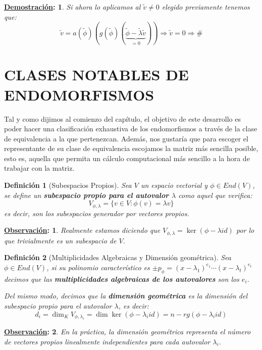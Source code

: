 \documentclass[10pt,a4paper,openright]{book}
\theoremstyle{break}
\newtheorem*{defi}{Definición}
\newtheorem*{demo}{\underline{Demostración}:}
\newtheorem*{obs}{\underline{Observación}:}
\begin{document}
\begin{demo}
Si ahora lo aplicamos al $\tilde{v}\neq 0$ elegido previamente tenemos que:
$$\tilde{v}=a(\tilde{\phi})\left(g(\tilde{\phi})\left(\underbrace{\tilde{\phi}-\tilde{\lambda}\tilde{v}}_{=0}\right)\right)\Rightarrow \tilde{v}=0\Rightarrow\#$$
\end{demo}


\section{CLASES NOTABLES DE ENDOMORFISMOS}
Tal y como dijimos al comienzo del capítulo, el objetivo de este desarrollo es poder hacer una clasificación exhaustiva de los endomorfismos a través de la clase de equivalencia a la que pertenezcan. Además, nos gustaría que para escoger el representante de su clase de equivalencia escojamos la matriz más sencilla posible, esto es, aquella que permita un cálculo computacional más sencillo a la hora de trabajar con la matriz.


\begin{defi}[Subespacios Propios]
Sea $V$ un espacio vectorial y $\phi  \in End(V)$, se define un \textbf{subespacio propio para el autovalor $\lambda$} como aquel que verifica:
$$V_{\phi, \lambda}=\{v\in V : \phi(v) = \lambda v\}$$
es decir, son los subespacios generador por vectores propios.
\end{defi}

\begin{obs}
Realmente estamos diciendo que $V_{\phi,\lambda} = \ker(\phi-\lambda id)$ por lo que trivialmente es un subespacio de $V$.
\end{obs}

\begin{defi}[Multiplicidades Algebraicas y Dimensión geométrica]
Sea $\phi \in End(V)$, si su polinomio característico es $\pm p_\phi=(x-\lambda_1)^{e_1}\cdots (x-\lambda_t)^{e_t}$ decimos que las \textbf{multiplicidades algebraicas de los autovalores} son los $e_i$.

Del mismo modo, decimos que la \textbf{dimensión geométrica} es la dimensión del subespacio propio para el autovalor $\lambda$, es decir:
$$d_i=\dim_K V_{\phi,\lambda_i} = \dim \ker(\phi-\lambda_i id)= n - rg(\phi-\lambda_i id)$$
\end{defi}
\begin{obs}
En la práctica, la dimensión geométrica representa el número de vectores propios linealmente independientes para cada autovalor $\lambda_i$.
\end{obs}
\end{document}
